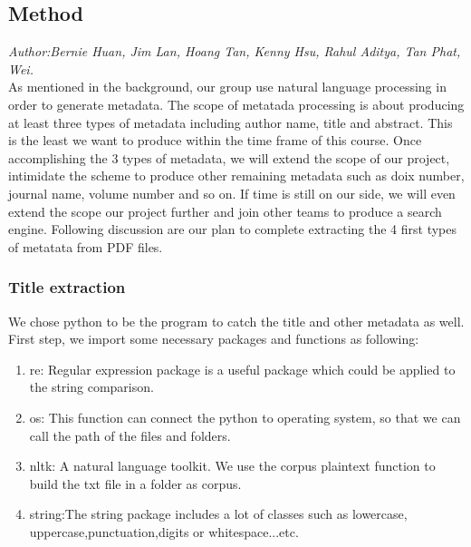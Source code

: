 \subsection{Method} %
\textit{\footnotesize Author:Bernie Huan, Jim Lan, Hoang Tan, Kenny Hsu, Rahul Aditya, Tan Phat, Wei.}\\

As mentioned in the background, our group use natural language processing in order to generate metadata.
The scope of metatada processing is about producing at least three types of metadata including author name, title and abstract.
This is the least we want to produce within the time frame of this course.
Once accomplishing the 3 types of metadata, we will extend the scope of our project, intimidate the scheme to produce other remaining metadata such as doix number, journal name, volume number and so on.
If time is still on our side, we will even extend the scope our project further and join other teams to produce a search engine.
Following discussion are our plan to complete extracting the 4 first types of metatata from PDF files.

\subsubsection{Title extraction}

We chose python to be the program to catch the title and other metadata as well.
First step, we import some necessary packages and functions as following:

\begin{enumerate}
	
	\item re: Regular expression package is a useful package which could be applied to the string comparison.
	\item os: This function can connect the python to operating system, so that we can call the path of the files and folders.
	\item nltk: A natural language toolkit.	We use the corpus plaintext function to build the txt file in a folder as corpus.
	\item string:The string package includes a lot of classes such as lowercase, uppercase,punctuation,digits or whitespace...etc.
	
\end{enumerate}  

